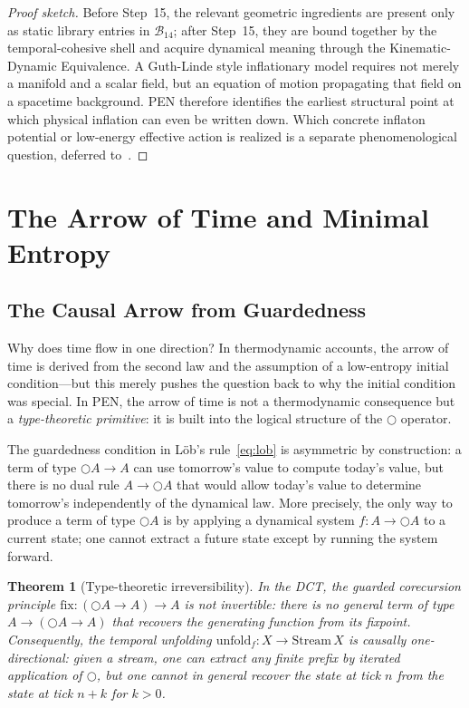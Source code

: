\documentclass[11pt,a4paper]{article}
\theoremstyle{plain}
\newtheorem{theorem}{Theorem}[section]
\theoremstyle{definition}
\theoremstyle{remark}
\newcommand{\B}{\mathcal{B}}
\newcommand{\nextmod}{\bigcirc}
\newcommand{\fix}{\mathrm{fix}}
\newcommand{\Stream}{\mathrm{Stream}}
\newcommand{\unfold}{\mathrm{unfold}}
\begin{document}
\begin{proof}[Proof sketch]
Before Step~15, the relevant geometric ingredients are present only as static library entries in $\B_{14}$; after Step~15, they are bound together by the temporal-cohesive shell and acquire dynamical meaning through the Kinematic-Dynamic Equivalence.
A Guth-Linde style inflationary model requires not merely a manifold and a scalar field, but an equation of motion propagating that field on a spacetime background.
PEN therefore identifies the earliest structural point at which physical inflation can even be written down.
Which concrete inflaton potential or low-energy effective action is realized is a separate phenomenological question, deferred to~\cite{gr-companion}.
\end{proof}


\section{The Arrow of Time and Minimal Entropy}
\label{sec:arrow}

\subsection{The Causal Arrow from Guardedness}
\label{sec:causal-arrow}

Why does time flow in one direction?
In thermodynamic accounts, the arrow of time is derived from the second law and the assumption of a low-entropy initial condition---but this merely pushes the question back to why the initial condition was special.
In PEN, the arrow of time is not a thermodynamic consequence but a \emph{type-theoretic primitive}: it is built into the logical structure of the $\nextmod$ operator.

The guardedness condition in L\"ob's rule~\eqref{eq:lob} is asymmetric by construction: a term of type $\nextmod A \to A$ can use tomorrow's value to compute today's value, but there is no dual rule $A \to \nextmod A$ that would allow today's value to determine tomorrow's independently of the dynamical law.
More precisely, the only way to produce a term of type $\nextmod A$ is by applying a dynamical system $f : A \to \nextmod A$ to a current state; one cannot extract a future state except by running the system forward.

\begin{theorem}[Type-theoretic irreversibility]
\label{thm:irreversibility}
In the DCT, the guarded corecursion principle $\fix : (\nextmod A \to A) \to A$ is not invertible: there is no general term of type $A \to (\nextmod A \to A)$ that recovers the generating function from its fixpoint.
Consequently, the temporal unfolding $\unfold_f : X \to \Stream\, X$ is causally one-directional: given a stream, one can extract any finite prefix by iterated application of $\nextmod$, but one cannot in general recover the state at tick $n$ from the state at tick $n + k$ for $k > 0$.
\end{theorem}
\end{document}
